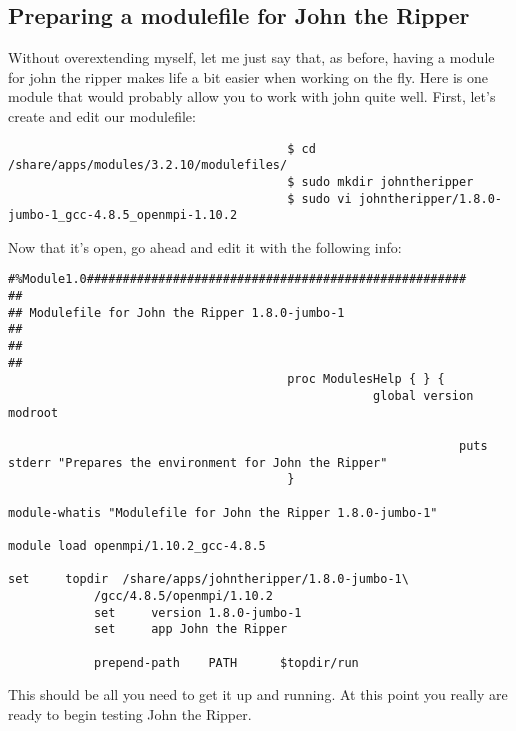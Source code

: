 \documentclass[]{article}
\begin{document}
                                       \subsection{Preparing a modulefile for John the Ripper}
                                       Without overextending myself, let me just say that, as before, having a module for john the ripper makes life a bit easier when working 
                                       on the fly. Here is one module that would probably allow you to work with john quite well. First, let's create and edit our modulefile:
                                       \begin{lstlisting}
                                       $ cd /share/apps/modules/3.2.10/modulefiles/
                                       $ sudo mkdir johntheripper
                                       $ sudo vi johntheripper/1.8.0-jumbo-1_gcc-4.8.5_openmpi-1.10.2
                                       \end{lstlisting}
                                       Now that it's open, go ahead and edit it with the following info:
                                       \begin{lstlisting}
#%Module1.0#####################################################
##
## Modulefile for John the Ripper 1.8.0-jumbo-1
##
##
##
                                       proc ModulesHelp { } {
                                                   global version modroot

                                                               puts stderr "Prepares the environment for John the Ripper"
                                       }

module-whatis "Modulefile for John the Ripper 1.8.0-jumbo-1"

module load openmpi/1.10.2_gcc-4.8.5

set     topdir  /share/apps/johntheripper/1.8.0-jumbo-1\
            /gcc/4.8.5/openmpi/1.10.2
            set     version 1.8.0-jumbo-1
            set     app John the Ripper

            prepend-path    PATH      $topdir/run
            \end{lstlisting}
            This should be all you need to get it up and running. At this point you really are ready to begin testing John the Ripper.
\end{document}
